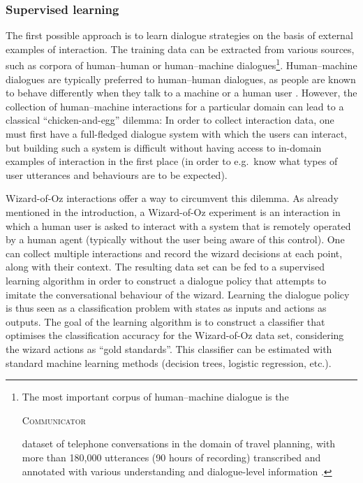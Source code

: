 \subsubsection*{Supervised learning}

The first possible approach is to learn dialogue strategies on the basis of external examples of interaction.  The training data can be extracted from various sources, such as corpora of human--human or human--machine dialogues\footnote{The most important corpus of human--machine dialogue is the \begin{small}\textsc{Communicator}\end{small} dataset of telephone conversations in the domain of travel planning, with more than 180,000 utterances (90 hours of recording) transcribed and annotated with various understanding and dialogue-level information \citep{BennettR02}.}.  Human--machine dialogues are typically preferred to human--human dialogues, as people are known to behave differently when they talk to a machine or a human user  \citep{JonnsonD88}.  However, the collection of human--machine interactions for a particular domain can lead to a  classical ``chicken-and-egg'' dilemma: In order to collect interaction data, one must first have a full-fledged dialogue system with which the users can interact, but building such a system is difficult without having access to in-domain examples of interaction in the first place (in order to e.g.\ know what types of user utterances and behaviours are to be expected). 

Wizard-of-Oz interactions offer a way to circumvent this dilemma. As already mentioned in the introduction, a Wizard-of-Oz experiment is an interaction in which a human user is asked to interact with a system that is remotely operated by a human agent (typically without the user being aware of this control).  One can collect multiple interactions and record the wizard decisions at each point, along with their context.   The resulting data set can be fed to a supervised learning algorithm in order to construct a dialogue policy that attempts to imitate the conversational behaviour of the wizard.  Learning the dialogue policy is thus seen as a classification problem with states as inputs and actions as outputs. The goal of the learning algorithm is to construct a classifier that optimises the classification accuracy for the Wizard-of-Oz data set, considering the wizard actions as ``gold standards''.  This classifier can be estimated with standard machine learning methods (decision trees, logistic regression, etc.).
 
